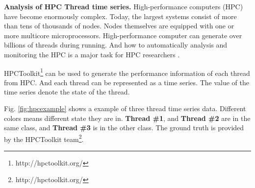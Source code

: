 

\textbf{Analysis of HPC Thread time series.}
High-performance computers (HPC) have become enormously complex. Today, the largest systems consist of more than tens of thousands of nodes. Nodes themselves are equipped with one or more multicore microprocessors\cite{adhianto2010hpctoolkit}. 
High-performance computer can generate over billions of threads during running.
And how to automatically analysis and monitoring the HPC is a major task for HPC researchers \cite{mccurdy2010memphis,tallent2009effective}.


HPCToolkit\footnote{http://hpctoolkit.org/} can be used to generate the performance information of each thread from HPC. 
And each thread can be represented as a time series. The value of the time series denote the state of the thread.


Fig. \ref{fig:hpcexample} shows a example of three thread time series data. Different colors means different state they are in. 
\textbf{Thread \#1}, and \textbf{Thread \#2} are in the same class, and \textbf{Thread \#3} is in the other class. The ground truth is provided by the HPCToolkit team\footnote{http://hpctoolkit.org/}.

